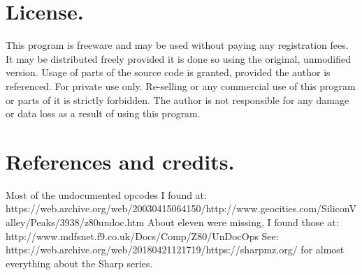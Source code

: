 \documentclass{article}
\begin{document}
\section{License.}
This program is freeware and may be used without paying any registration fees.
It may be distributed freely provided it is done so using the original, 
unmodified version. Usage of parts of the source code is granted, provided the 
author is referenced. For private use only. Re-selling or any commercial use of
this program or parts of it is strictly forbidden. The author is not 
responsible for any damage or data loss as a result of using this program.

\section{References and credits.}
Most of the undocumented opcodes I found at: \\
https://web.archive.org/web/20030415064150/http://www.geocities.com/SiliconValley/Peaks/3938/z80undoc.htm About eleven 
were missing, I found those at: \\
http://www.mdfsnet.f9.co.uk/Docs/Comp/Z80/UnDocOps See: \\
https://web.archive.org/web/20180421121719/https://sharpmz.org/ for almost everything about the Sharp series.
\end{document}
